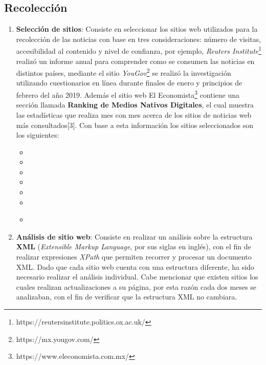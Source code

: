 \subsection{Recolección}

\begin{enumerate}
  \item \textbf{Selección de sitios}: Consiste en seleccionar los sitios web utilizados para la recolección de las noticias con base en tres consideraciones: número de visitas, accesibilidad al contenido y nivel de confianza, por ejemplo, \textit{Reuters Institute}\footnote{https://reutersinstitute.politics.ox.ac.uk/} realizó un informe anual para comprender como se consumen las noticias en distintos países, mediante el sitio \textit{YouGov}\footnote{https://mx.yougov.com/} se realizó la investigación utilizando cuestionarios en línea durante finales de enero y principios de febrero del año 2019. Además el sitio web El Economista\footnote{https://www.eleconomista.com.mx/} contiene una sección llamada \textbf{Ranking de Medios Nativos Digitales}, el cual muestra las estadísticas que realiza mes con mes acerca de los sitios de noticias web más consultados[3]. Con base a esta información los sitios seleccionados son los siguientes:\\

  \begin{itemize}
    \item {}
    \item {}
    \item {}
    \item {}
    \item {}
    \item {}
    \item {}\\
  \end{itemize}

  \item \textbf{Análisis de sitio web}: Consiste en realizar un análisis sobre la estructura \textbf{XML} (\textit{Extensible Markup Language}, por sus siglas en inglés), con el fin de realizar expresiones \textit{XPath} que permiten recorrer y procesar un documento XML. Dado que cada sitio web cuenta con una estructura diferente, ha sido necesario realizar el análisis individual. Cabe mencionar que existen sitios los cuales realizan actualizaciones a su página, por esta razón cada dos meses se analizaban, con el fin de verificar que la estructura XML no cambiara.\\


\end{enumerate}
